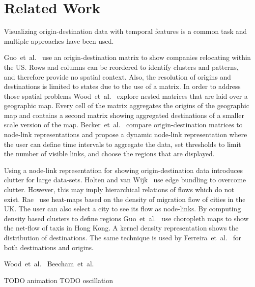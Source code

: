\documentclass[a4paper,twocolumn]{article}
\author{Josua Krause}
\begin{document}
\section*{Related Work}
Visualizing origin-destination data with temporal features
is a common task and multiple approaches have been used.

Guo~et~al.~\cite{Guo2006} use an origin-destination matrix
to show companies relocating within the US.
Rows and columns can be reordered to identify clusters
and patterns, and therefore provide no spatial context.
Also, the resolution of origins and destinations is limited
to states due to the use of a matrix.
In order to address those spatial problems
Wood~et~al.~\cite{Wood2002} explore nested matrices
that are laid over a geographic map.
Every cell of the matrix aggregates the origins
of the geographic map and contains
a second matrix showing aggregated destinations of
a smaller scale version of the map.
Becker~et~al.~\cite{Becker1995} compare
origin-destination matrices to node-link representations
and propose a dynamic node-link representation
where the user can define time intervals to aggregate the data,
set thresholds to limit the number of visible links,
and choose the regions that are displayed.

Using a node-link representation for showing origin-destination
data introduces clutter for large data-sets.
Holten and van Wijk~\cite{Holten2009} use edge bundling
to overcome clutter. However, this may imply hierarchical
relations of flows which do not exist.
Rae~\cite{Rae2009} use heat-maps based on
the density of migration flow of cities in the UK.
The user can also select a city to see its flow as node-links.
By computing density based clusters to define regions
Guo~et~al.~\cite{Guo2012} use choropleth maps to show
the net-flow of taxis in Hong Kong.
A kernel density representation shows the distribution
of destinations.
The same technique is used by Ferreira~et~al.~\cite{Ferreira2013}
for both destinations and origins.

Wood~et~al.~\cite{Wood2011}
Beecham~et~al.~\cite{Beecham2012}

TODO animation
TODO oscillation




\end{document}
